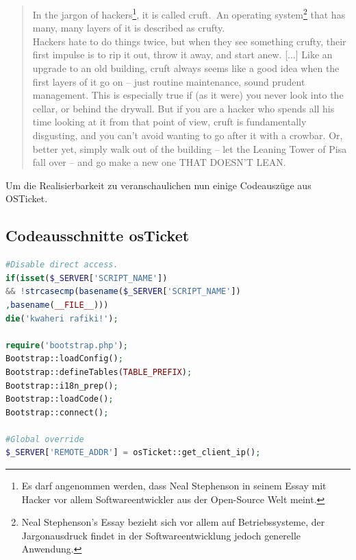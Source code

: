 \blockcquote{cmdlinestephenson}{
	 In the jargon of hackers\footnote{Es darf angenommen werden, dass Neal Stephenson in seinem Essay mit Hacker vor allem Softwareentwickler aus der Open-Source Welt meint.}, it is called
	\glqq cruft.\grqq\ An operating system\footnote{Neal Stephenson's Essay bezieht sich vor allem auf Betriebssysteme, der Jargonausdruck findet in der Softwareentwicklung jedoch generelle Anwendung.} that has many, many layers of it is described as \glqq crufty.\grqq \\
	Hackers hate to do things twice, but when they see something crufty, their first impulse
	is to rip it out, throw it away, and start anew.
	[...]
	Like an upgrade to an old building, cruft always seems like a good idea when the first layers of it go on – just routine maintenance, sound prudent management. This is especially true if (as it were) you never look into the cellar, or behind the drywall. But if you are a hacker who spends all his time looking at it from that point of view, cruft is fundamentally disgusting, and you can’t avoid wanting to go after it with a crowbar. Or, better yet, simply walk out of the building – let the Leaning Tower of Pisa fall over – and go make a new one THAT DOESN’T LEAN.
}

Um die Realisierbarkeit zu veranschaulichen nun einige Codeauszüge aus OSTicket.
\newpage
\subsection{Codeausschnitte osTicket}
\begin{lstlisting}[language=PHP, caption=main.inc.php, firstnumber=18]
#Disable direct access.
if(isset($_SERVER['SCRIPT_NAME'])
&& !strcasecmp(basename($_SERVER['SCRIPT_NAME'])
,basename(__FILE__)))
die('kwaheri rafiki!');

require('bootstrap.php');
Bootstrap::loadConfig();
Bootstrap::defineTables(TABLE_PREFIX);
Bootstrap::i18n_prep();
Bootstrap::loadCode();
Bootstrap::connect();

#Global override
$_SERVER['REMOTE_ADDR'] = osTicket::get_client_ip();

\end{lstlisting}

